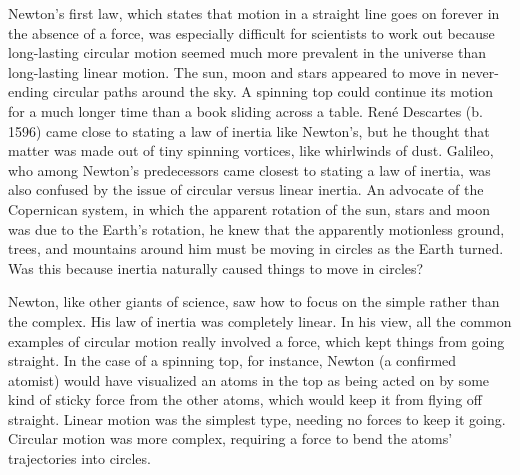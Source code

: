 \label{lab:moment-of-inertia}

\apparatus
{}


\introduction

Newton's first law, which states that motion in a straight
line goes on forever in the absence of a force, was
especially difficult for scientists to work out because
long-lasting circular motion seemed much more prevalent in
the universe than long-lasting linear motion.  The sun, moon
and stars appeared to move in never-ending circular paths
around the sky.  A spinning top could continue its motion
for a much longer time than a book sliding across a table. 
Ren\'{e} Descartes (b. 1596) came close to stating a law of
inertia like Newton's, but he thought that matter was made
out of tiny spinning vortices, like whirlwinds of dust. 
Galileo, who among Newton's predecessors came closest to
stating a law of inertia, was also confused by the issue of
circular versus linear inertia.  An advocate of the
Copernican system, in which the apparent rotation of the
sun, stars and moon was due to the Earth's rotation, he knew
that the apparently motionless ground, trees, and mountains
around him must be moving in circles as the Earth turned. 
Was this because inertia naturally caused things to move in circles?

Newton, like other giants of science, saw how to focus on
the simple rather than the complex.  His law of inertia was
completely linear.  In his view, all the common examples of
circular motion really involved a force, which kept things
from going straight.  In the case of a spinning top, for
instance, Newton (a confirmed atomist) would have visualized
an atoms in the top as being acted on by some kind of sticky
force from the other atoms, which would keep it from flying
off straight.  Linear motion was the simplest type, needing
no forces to keep it going.  Circular motion was more
complex, requiring a force to bend the atoms' trajectories into circles.

